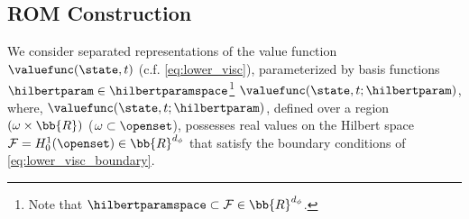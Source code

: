 \subsection{ROM Construction}
 \noindent %
We consider separated representations of the value function $\valuefunc (\state,t)$  (c.f. \eqref{eq:lower_visc}), parameterized  by basis functions $\hilbertparam \in \hilbertparamspace$\footnote{Note that $\hilbertparamspace\subset \mathcal{F} \in \bb{R}^{d_\phi}$.} \ie $\valuefunc (\state,t; \hilbertparam)$, where, $\valuefunc (\state,t; \hilbertparam)$, defined over a region $(\omega\times \bb{R})$ ($\omega \subset \openset$), possesses real values on the Hilbert space $\mathcal{F}=H_0^1(\openset) \in \bb{R}^{d_\phi}$  that satisfy the  boundary conditions of \eqref{eq:lower_visc_boundary}. 

